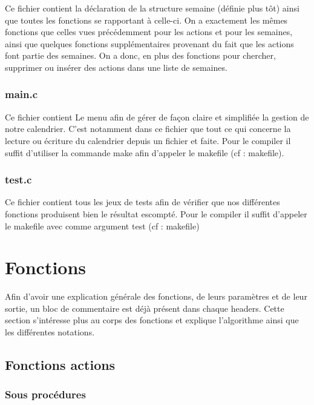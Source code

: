 \documentclass[11pt]{article}
\begin{document}
Ce fichier contient la déclaration de la structure semaine (définie plus tôt) ainsi que toutes les fonctions se rapportant à celle-ci. On a exactement les mêmes fonctions que celles vues précédemment pour les actions et pour les semaines, ainsi que quelques fonctions supplémentaires provenant du fait que les actions font partie des semaines. On a donc, en plus des fonctions pour chercher, supprimer ou insérer des actions dans une liste de semaines.


\subsubsection{main.c}
\label{sec:org59b5416}

Ce fichier contient Le menu afin de gérer de façon claire et simplifiée la
gestion de notre calendrier. C'est notamment dans ce fichier que tout ce qui
concerne la lecture ou écriture du calendrier depuis un fichier et faite.
Pour le compiler il suffit d'utiliser la commande make afin d'appeler le
makefile (cf : makefile).

\subsubsection{test.c}
\label{sec:org4c95a96}

Ce fichier contient tous les jeux de tests afin de vérifier que nos différentes fonctions produisent bien le résultat escompté. Pour le compiler il suffit d'appeler le makefile avec comme argument test (cf : makefile)


\section{Fonctions}
\label{sec:org2a362a5}

Afin d'avoir une explication générale des fonctions, de leurs paramètres et de
leur sortie, un bloc de commentaire est déjà présent dans chaque headers. Cette
section s'intéresse plus au corps des fonctions et explique l'algorithme ainsi
que les différentes notations.

\subsection{Fonctions actions}
\label{sec:org787e83f}

\subsubsection{Sous procédures}
\label{sec:org0d0ab39}
\end{document}
